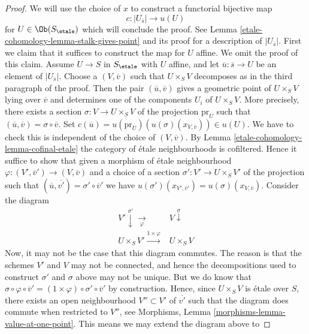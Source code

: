 \begin{proof}
\medskip\noindent
We will use the choice of $x$ to construct a functorial bijective map
$$
c : |U_{\overline{s}}| \longrightarrow u(U)
$$
for $U \in \Ob(S_\etale)$ which will conclude the proof. See
Lemma \ref{etale-cohomology-lemma-stalk-gives-point}
and its proof for a description of $|U_{\overline{s}}|$.
First we claim that it suffices to construct the map for $U$ affine.
We omit the proof of this claim.
Assume $U \to S$ in $S_\etale$ with $U$ affine, and let
$\overline{u} : \overline{s} \to U$ be an element of $|U_{\overline{s}}|$.
Choose a $(V, \overline{v})$ such that $U \times_S V$ decomposes
as in the third paragraph of the proof.
Then the pair $(\overline{u}, \overline{v})$ gives a geometric point of
$U \times_S V$ lying over $\overline{v}$ and determines one of the
components $U_i$ of $U \times_S V$. More precisely, there exists
a section $\sigma : V \to U \times_S V$ of the projection $\text{pr}_U$
such that $(\overline{u}, \overline{v}) = \sigma \circ \overline{v}$. Set
$c(\overline{u}) = u(\text{pr}_U)(u(\sigma)(x_{V, \overline{v}})) \in u(U)$.
We have to check this is independent of the choice of $(V, \overline{v})$. By
Lemma \ref{etale-cohomology-lemma-cofinal-etale}
the category of \'etale neighbourhoods is cofiltered.
Hence it suffice to show
that given a morphism of \'etale neighbourhood
$\varphi : (V', \overline{v}') \to (V, \overline{v})$ and a choice of a
section $\sigma' : V' \to U \times_S V'$ of the projection such that
$(\overline{u}, \overline{v'}) = \sigma' \circ \overline{v}'$
we have $u(\sigma')(x_{V', \overline{v}'}) = u(\sigma)(x_{V, \overline{v}})$.
Consider the diagram
$$
\begin{array}{cc}V' \overset{\sigma'}{\downarrow}\underset{\varphi}{\longrightarrow} & V \overset{\sigma}{\downarrow} \\ U \times_S V' \overset{1 \times \varphi}{\longrightarrow} & U \times_S V\end{array}
$$
Now, it may not be the case that this diagram commutes. The reason is
that the schemes $V'$ and $V$ may not be connected, and hence
the decompositions used to construct $\sigma'$ and $\sigma$ above may
not be unique. But we do know that
$\sigma \circ \varphi \circ \overline{v}' =
(1 \times \varphi) \circ \sigma' \circ \overline{v}'$
by construction. Hence, since $U \times_S V$ is \'etale over $S$,
there exists an open neighbourhood
$V'' \subset V'$ of $\overline{v'}$ such that the diagram does
commute when restricted to $V''$, see
Morphisms, Lemma \ref{morphisms-lemma-value-at-one-point}.
This means we may extend the diagram above to

\end{proof}
